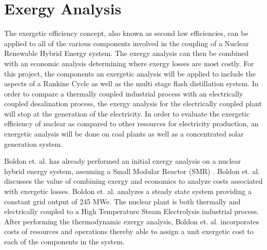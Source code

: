 \documentclass[12pt]{UIdahoMastersThesis}
\begin{document}
\section{Exergy Analysis}
The exergetic efficiency concept, also known as second law efficiencies, can be applied to all of the various components involved in the coupling of a Nuclear Renewable Hybrid Energy system. The exergy analysis can then be combined with an economic analysis determining where exergy losses are most costly. For this project, the components an exergetic analysis will be applied to include the aspects of a Rankine Cycle as well as the multi stage flash distillation system. In order to compare a thermally coupled industrial process with an electrically coupled desalination process, the exergy analysis for the electrically coupled plant will stop at the generation of the electricity. In order to evaluate the exergetic efficiency of nuclear as compared to other resources for electricity production, an exergetic analysis will be done on coal plants as well as a concentrated solar generation system.

  Boldon et. al. has already performed an initial exergy analysis on a nuclear hybrid energy system, assuming a Small Modular Reactor (SMR) \cite{Boldon}. Boldon et. al. discusses the value of combining exergy and economics to analyze costs associated with exergetic losses.  Boldon et. al. analyzes a steady state system providing a constant grid output of 245 MWe.  The nuclear plant is both thermally and electrically coupled to a High Temperature Steam Electrolysis industrial process. After performing the thermodynamic exergy analysis, Boldon et. al. incorporates costs of resources and operations thereby able to assign a unit exergetic cost to each of the components in the system.
\end{document}
